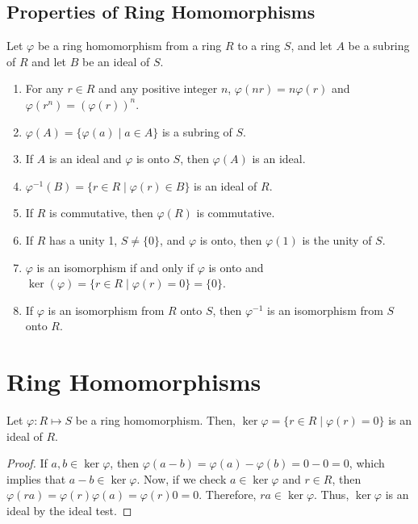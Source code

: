 \documentclass[letterpaper]{article}
\begin{document}
\subsection{Properties of Ring Homomorphisms}
\begin{theorem}{}{}
    Let $\varphi$ be a ring homomorphism from a ring $R$ to a ring $S$, and let $A$ be a subring of $R$ and let $B$ be an ideal of $S$.
    \begin{enumerate}
        \item For any $r \in R$ and any positive integer $n$, $\varphi(nr) = n\varphi(r)$ and $\varphi(r^n) = (\varphi(r))^n$.
        \item $\varphi(A) = \{\varphi(a) \mid a \in A\}$ is a subring of $S$. 
        \item If $A$ is an ideal and $\varphi$ is onto $S$, then $\varphi(A)$ is an ideal. 
        \item $\varphi^{-1}(B) = \{r \in R \mid \varphi(r) \in B\}$ is an ideal of $R$. 
        \item If $R$ is commutative, then $\varphi(R)$ is commutative.
        \item If $R$ has a unity 1, $S \neq \{0\}$, and $\varphi$ is onto, then $\varphi(1)$ is the unity of $S$. 
        \item $\varphi$ is an isomorphism if and only if $\varphi$ is onto and $\ker(\varphi) = \{r \in R \mid \varphi(r) = 0\} = \{0\}$. 
        \item If $\varphi$ is an isomorphism from $R$ onto $S$, then $\varphi^{-1}$ is an isomorphism from $S$ onto $R$. 
    \end{enumerate}
\end{theorem}

\section{Ring Homomorphisms}
\begin{theorem}{}{}
    Let $\varphi: R \mapsto S$ be a ring homomorphism. Then, $\ker \varphi = \{r \in R \mid \varphi(r) = 0\}$ is an ideal of $R$. 
\end{theorem}

\begin{mdframed}[]
    \begin{proof}
        If $a, b \in \ker \varphi$, then $\varphi(a - b) = \varphi(a) - \varphi(b) = 0 - 0 = 0$, which implies that $a - b \in \ker \varphi$. Now, if we check $a \in \ker \varphi$ and $r \in R$, then $\varphi(ra) = \varphi(r) \varphi(a) = \varphi(r) 0 = 0$. Therefore, $ra \in \ker \varphi$. Thus, $\ker \varphi$ is an ideal by the ideal test. 
    \end{proof}
\end{mdframed}
\end{document}
